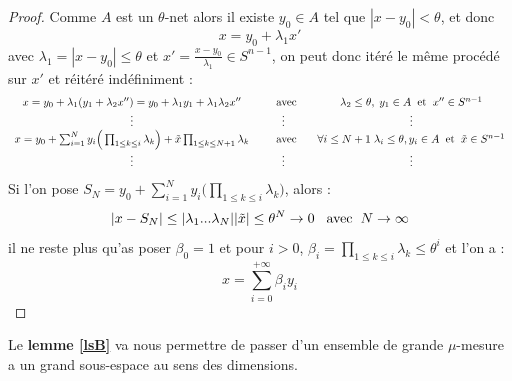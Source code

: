 \documentclass[12pt]{article}
\theoremstyle{definition}
\begin{document}
\begin{proof}
	Comme $A$ est un $\theta$-net alors il existe $y_0\in A$ tel que $|x-y_0|<\theta$, et donc
	\begin{equation*}
	x = y_0 + \lambda_1 x'
	\end{equation*}
	avec $\lambda_1= |x-y_0|\leq \theta$ et $x' = \frac{x-y_0}{\lambda_1}\in S^{n-1}$, on peut donc itéré le même procédé sur $x'$ et réitéré indéfiniment : 
	\begin{equation*}
	\begin{array}{ccc}
	x = y_0 + \lambda_1 (y_1+\lambda_2x'')=y_0+\lambda_1y_1+\lambda_1\lambda_2x'' &\text{\hspace{4mm} avec \hspace{2mm}}&  \lambda_2\leq \theta, \; y_1\in A \text{\hspace{2mm}et\hspace{2mm}} x''\in S^{n-1}\\
	\vdots&\vdots&\vdots\\
	x = y_0 + \sum_{i=1}^{N}y_i\Big(\prod_{1\leq k\leq i}\lambda_k\Big)+\tilde{x}\prod_{1\leq k\leq N+1}\lambda_k &\text{\hspace{4mm} avec \hspace{2mm}}&  \text{$\forall i\leq N+1$\hspace{1mm}} \lambda_i\leq \theta, y_i\in A \text{\hspace{2mm}et\hspace{2mm}} \tilde{x}\in S^{n-1}\\
	\vdots & \vdots & \vdots
	\end{array}
	\end{equation*} 
	Si l'on pose $S_N = y_0 + \sum_{i=1}^{N}y_i\Big(\prod_{1\leq k\leq i}\lambda_k\Big)$, alors :
	\begin{equation*}
	|x-S_N| \leq |\lambda_1 ... \lambda_N| |\tilde{x}|\leq \theta^{N} \to 0  \text{\hspace{3mm}avec\hspace{2mm}}  N\to \infty
	\end{equation*}
	il ne reste plus qu'as poser $\beta_0=1$ et pour $i>0$, $\beta_i=\prod_{1 \leq k\leq i}\lambda_k\leq \theta^i$ et l'on a :
	\begin{equation*}
	x = \sum_{i=0}^{+\infty} \beta_i y_i
	\end{equation*}
\end{proof}
Le \textbf{lemme \ref{lsB}} va nous permettre de passer d'un ensemble de grande $\mu$-mesure a un grand sous-espace au sens des dimensions. 
\end{document}
